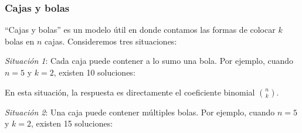 \subsubsection{Cajas y bolas}

``Cajas y bolas'' es un modelo útil en donde contamos las formas de colocar
$k$ bolas en $n$ cajas. Consideremos tres situaciones:

\textit{Situación 1}: Cada caja puede contener a lo sumo una bola.
Por ejemplo, cuando $n=5$ y $k=2$, existen 10 soluciones:

\begin{center}
\end{center}

En esta situación, la respuesta es directamente el coeficiente binomial
$\binom{n}{k}$.

\pagebreak
\textit{Situación 2}: Una caja puede contener múltiples bolas. Por ejemplo,
cuando $n=5$ y $k=2$, existen 15 soluciones:

